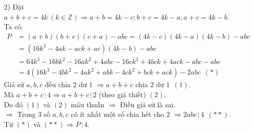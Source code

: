 \begin{ex}
{\begin{enumerate}
			Vậy $m=4, m=9$ là các giá trị cần tìm.
			\item[2)] Đặt $a+b+c = 4k~(k \in \mathbb{Z}) \Rightarrow a+b = 4k-c; b+c = 4k-a; a+c = 4k-b$. \\
			Ta có:
				\begin{align*}
					P&=(a+b)(b+c)(c+a)-abc=(4k-c)(4k-a)(4k-b)-abc \\
					&=\left(16k^2-4ak-ack+ac\right)\left(4k-b\right)-abc \\
					&=64k^3-16bk^2-16ak^2+4abc-16ck^2+4bck+4ack-abc-abc \\
					&=4\left(16k^3-4bk^2-4ak^2+abk-4ck^2+bck+ack\right)-2abc~~(*)
				\end{align*}
			Giả sử $a,b,c$ đều chia $2$ dư $1$ $\Rightarrow a+b+c$ chia $2$ dư $1~~(1)$. \\
			Mà $a+b+c \, \vdots \, 4 \Rightarrow a+b+c \, \vdots \, 2$ (theo giả thiết) $(2)$. \\
			Do đó $(1)$ và $(2)$ mâu thuẫn $\Rightarrow$ Điều giả sử là sai. \\
			$\Rightarrow$ Trong $3$ số $a,b,c$ có ít nhất một số chia hết cho $2$ $\Rightarrow 2abc \, \vdots \, 4~~(**)$. \\
			Từ $(*)$ và $(**) \Rightarrow P \, \vdots \, 4$.
		\end{enumerate}
	}
\end{ex}

